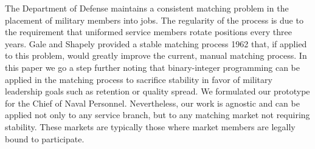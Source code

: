 The Department of Defense maintains a consistent matching problem in the placement of military members into jobs. The regularity of the process is due to the requirement that uniformed service members rotate positions every three years. Gale and Shapely provided a stable matching process 1962 that, if applied to this problem, would greatly improve the current, manual matching process. In this paper we go a step further noting that binary-integer programming can be applied in the matching process to sacrifice stability in favor of military leadership goals such as retention or quality spread. We formulated our prototype for the Chief of Naval Personnel. Nevertheless, our work is agnostic and can be applied not only to any service branch, but to any matching market not requiring stability. These markets are typically those where market members are legally bound to participate. 

